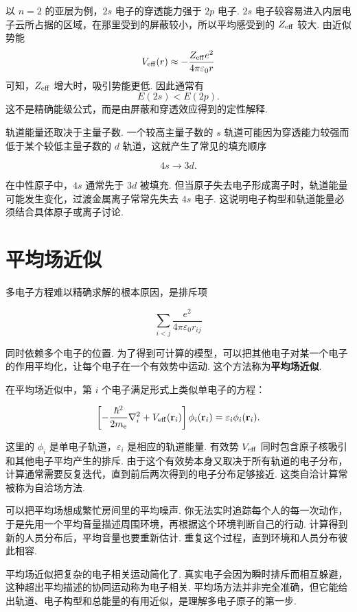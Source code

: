 \documentclass[UTF8,11pt,a4paper,openany]{ctexbook}
\newcommand{\term}[1]{\textbf{#1}}
\begin{document}
\begin{derivationbox}
以 $n=2$ 的亚层为例，$2s$ 电子的穿透能力强于 $2p$ 电子. $2s$ 电子较容易进入内层电子云所占据的区域，在那里受到的屏蔽较小，所以平均感受到的 $Z_{\rm eff}$ 较大. 由近似势能
\[
V_{\rm eff}(r)
\approx
-\frac{Z_{\rm eff}e^2}{4\pi\varepsilon_0 r}
\]
可知，$Z_{\rm eff}$ 增大时，吸引势能更低. 因此通常有
\[
E(2s)<E(2p).
\]
这不是精确能级公式，而是由屏蔽和穿透效应得到的定性解释. 
\end{derivationbox}

轨道能量还取决于主量子数. 一个较高主量子数的 $s$ 轨道可能因为穿透能力较强而低于某个较低主量子数的 $d$ 轨道，这就产生了常见的填充顺序

\[
4s\longrightarrow 3d.
\]

在中性原子中，$4s$ 通常先于 $3d$ 被填充. 但当原子失去电子形成离子时，轨道能量可能发生变化，过渡金属离子常常先失去 $4s$ 电子. 这说明电子构型和轨道能量必须结合具体原子或离子讨论. 

\section{平均场近似}

多电子方程难以精确求解的根本原因，是排斥项

\[
\sum_{i<j}
\frac{e^2}{4\pi\varepsilon_0 r_{ij}}
\]

同时依赖多个电子的位置. 为了得到可计算的模型，可以把其他电子对某一个电子的作用平均化，让每个电子在一个有效势中运动. 这个方法称为\term{平均场近似}. 

在平均场近似中，第 $i$ 个电子满足形式上类似单电子的方程：

\[
\left[
-\frac{\hbar^2}{2m_{\rm e}}\nabla_i^2
+
V_{\rm eff}(\mathbf r_i)
\right]\phi_i(\mathbf r_i)
=
\varepsilon_i\phi_i(\mathbf r_i).
\]

这里的 $\phi_i$ 是单电子轨道，$\varepsilon_i$ 是相应的轨道能量. 有效势 $V_{\rm eff}$ 同时包含原子核吸引和其他电子平均产生的排斥. 由于这个有效势本身又取决于所有轨道的电子分布，计算通常需要反复迭代，直到前后两次得到的电子分布足够接近. 这类自洽计算常被称为自洽场方法. 

\begin{analogybox}
可以把平均场想成繁忙房间里的平均噪声. 你无法实时追踪每个人的每一次动作，于是先用一个平均音量描述周围环境，再根据这个环境判断自己的行动. 计算得到新的人员分布后，平均音量也要重新估计. 重复这个过程，直到环境和人员分布彼此相容. 
\end{analogybox}

平均场近似把复杂的电子相关运动简化了. 真实电子会因为瞬时排斥而相互躲避，这种超出平均描述的协同运动称为电子相关. 平均场方法并非完全准确，但它能给出轨道、电子构型和总能量的有用近似，是理解多电子原子的第一步. 
\end{document}
